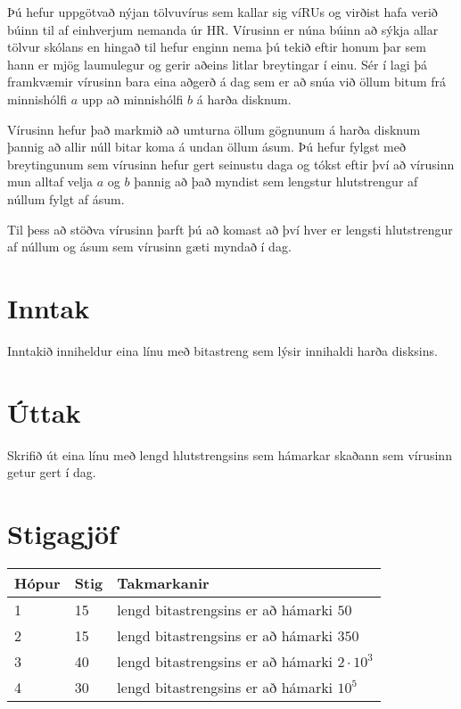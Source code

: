 
Þú hefur uppgötvað nýjan tölvuvírus sem kallar sig víRUs og virðist hafa verið búinn til
af einhverjum nemanda úr HR. Vírusinn er núna búinn að sýkja allar tölvur skólans
en hingað til hefur enginn nema þú tekið eftir honum þar sem hann er mjög laumulegur og gerir
aðeins litlar breytingar í einu. Sér í lagi þá framkvæmir vírusinn bara eina aðgerð á dag
sem er að snúa við öllum bitum frá minnishólfi $a$ upp að minnishólfi $b$ á harða disknum.

Vírusinn hefur það markmið að umturna öllum gögnunum á harða disknum þannig að
allir núll bitar koma á undan öllum ásum. Þú hefur fylgst með breytingunum
sem vírusinn hefur gert seinustu daga og tókst eftir því að vírusinn mun alltaf
velja $a$ og $b$ þannig að það myndist sem lengstur hlutstrengur
af núllum fylgt af ásum.

Til þess að stöðva vírusinn þarft þú að komast að því hver er lengsti hlutstrengur af
núllum og ásum sem vírusinn gæti myndað í dag.

\section*{Inntak}
Inntakið inniheldur eina línu með bitastreng sem lýsir innihaldi harða disksins.

\section*{Úttak}
Skrifið út eina línu með lengd hlutstrengsins sem hámarkar skaðann sem vírusinn getur gert í dag.

\section*{Stigagjöf}
\begin{tabular}{|l|l|l|}
\hline
Hópur & Stig & Takmarkanir \\ \hline
1     & 15   & lengd bitastrengsins er að hámarki $50$ \\ \hline
2     & 15   & lengd bitastrengsins er að hámarki $350$ \\ \hline
3     & 40   & lengd bitastrengsins er að hámarki $2 \cdot 10^3$ \\ \hline
4     & 30   & lengd bitastrengsins er að hámarki $10^5$ \\ \hline
\end{tabular}

